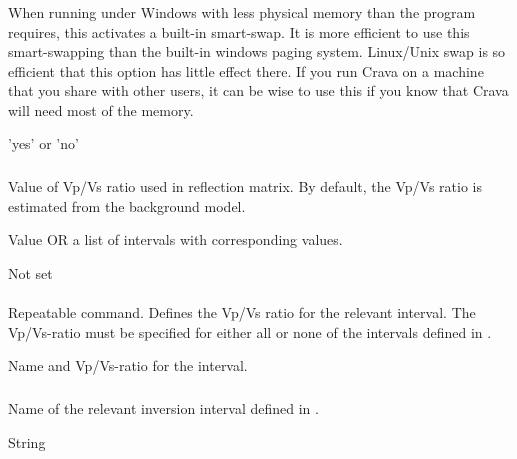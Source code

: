 \subsubsection{} 
 \slist
   \item \Description When running under Windows with less physical
     memory than the program requires, this activates a built-in
     smart-swap. It is more efficient to use this smart-swapping than
     the built-in windows paging system. Linux/Unix swap is so
     efficient that this option has little effect there. If you run
     Crava on a machine that you share with other users, it can be
     wise to use this if you know that Crava will need most of the
     memory.
   \item \Argument 'yes' or 'no'
   \item \Default
 \elist

\subsubsection{}
 \slist
   \item \Description Value of Vp/Vs ratio used in reflection
     matrix. By default, the Vp/Vs ratio is estimated from the
     background model.
   \item \Argument Value OR a list of intervals with corresponding values.
   \item \Default Not set
   \elist
   
\paragraph{}
 \slist
   \item \Description Repeatable command. Defines the Vp/Vs ratio for the relevant interval. The Vp/Vs-ratio must be specified for either all or none of the intervals defined in .
   \item \Argument Name and Vp/Vs-ratio for the interval.
   \item \Default
 \elist

\subparagraph{}
 \slist
   \item \Description Name of the relevant inversion interval defined in .
   \item \Argument String
   \item \Default
 \elist
 
